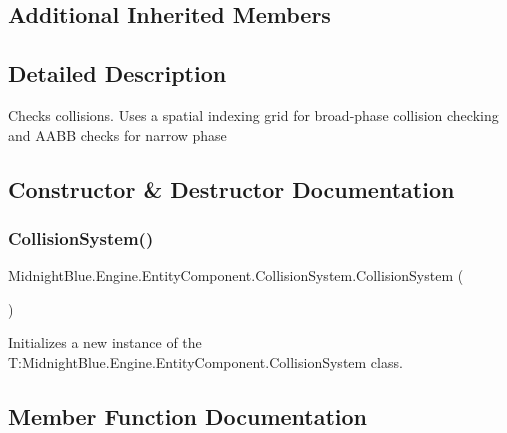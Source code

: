 \subsection*{Additional Inherited Members}


\subsection{Detailed Description}
Checks collisions. Uses a spatial indexing grid for broad-\/phase collision checking and A\+A\+BB checks for narrow phase 



\subsection{Constructor \& Destructor Documentation}
\hypertarget{class_midnight_blue_1_1_engine_1_1_entity_component_1_1_collision_system_a5554a62d950263148006d2e5f907da15}{}\label{class_midnight_blue_1_1_engine_1_1_entity_component_1_1_collision_system_a5554a62d950263148006d2e5f907da15} 
\subsubsection{\texorpdfstring{Collision\+System()}{CollisionSystem()}}
{\footnotesize\ttfamily Midnight\+Blue.\+Engine.\+Entity\+Component.\+Collision\+System.\+Collision\+System (\begin{DoxyParamCaption}{ }\end{DoxyParamCaption})\hspace{0.3cm}{\ttfamily [inline]}}



Initializes a new instance of the T\+:\+Midnight\+Blue.\+Engine.\+Entity\+Component.\+Collision\+System class. 



\subsection{Member Function Documentation}
\hypertarget{class_midnight_blue_1_1_engine_1_1_entity_component_1_1_collision_system_ab85ff8fd81369e705c461f58014f5ec2}{}\label{class_midnight_blue_1_1_engine_1_1_entity_component_1_1_collision_system_ab85ff8fd81369e705c461f58014f5ec2} 
